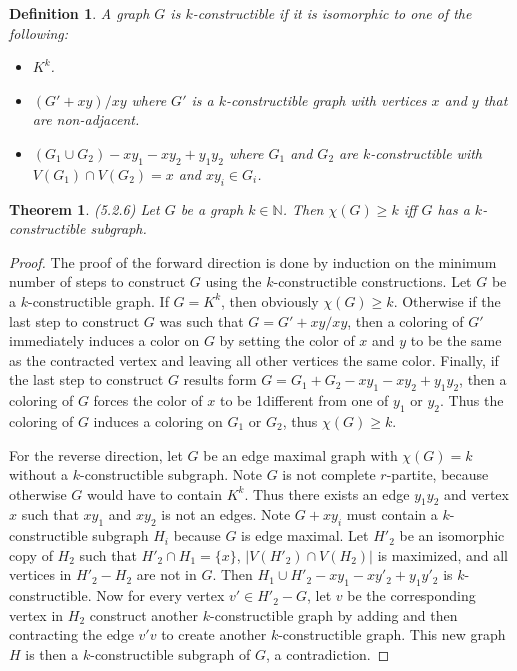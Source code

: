 \documentclass[12pt]{article}
\newtheorem{theorem}{Theorem}
\newtheorem{definition}{Definition}
\begin{document}
\begin{definition} A graph $G$ is $k$-constructible if it is
  isomorphic to one of the following:
  \begin{itemize}
  \item[(i)] $K^k$.
  \item[(ii)] $(G' + xy)/xy$ where $G'$ is a $k$-constructible graph
    with vertices $x$ and $y$ that are non-adjacent.
  \item[(iii)] $(G_1 \cup G_2)-xy_1 - xy_2 + y_1y_2$ where $G_1$ and
    $G_2$ are $k$-constructible with $V(G_1) \cap V(G_2) = x$ and
    $xy_i \in G_i$.
  \end{itemize}
\end{definition}
\begin{theorem} (5.2.6) Let $G$ be a graph $k \in \mathbb{N}$. Then
  $\chi(G) \geq k$ iff $G$ has a $k$-constructible subgraph.
\end{theorem}
\begin{proof} The proof of the forward direction is done by induction
  on the minimum number of steps to construct $G$ using the
  $k$-constructible constructions. Let $G$ be a $k$-constructible
  graph. If $G = K^k$, then obviously $\chi(G) \geq k$. Otherwise if
  the last step to construct $G$ was such that $G = G' + xy /xy$, then
  a coloring of $G'$ immediately induces a color on $G$ by setting the
  color of $x$ and $y$ to be the same as the contracted vertex and
  leaving all other vertices the same color. Finally, if the last step
  to construct $G$ results form $G = G_1 + G_2 -xy_1 - xy_2 + y_1y_2$,
  then a coloring of $G$ forces the color of $x$ to be 1different from
  one of $y_1$ or $y_2$. Thus the coloring of $G$ induces a coloring
  on $G_1$ or $G_2$, thus $\chi(G) \geq k$.

  For the reverse direction, let $G$ be an edge maximal graph with
  $\chi(G) = k$ without a $k$-constructible subgraph. Note $G$ is not
  complete $r$-partite, because otherwise $G$ would have to contain
  $K^k$. Thus there exists an edge $y_1 y_2$ and vertex $x$ such that
  $xy_1$ and $xy_2$ is not an edges. Note $G + x y_i$ must contain a
  $k$-constructible subgraph $H_i$ because $G$ is edge maximal. Let
  $H'_2$ be an isomorphic copy of $H_2$ such that
  $H'_2 \cap H_1 = \{x\}$, $|V(H'_2) \cap V(H_2)|$ is maximized, and
  all vertices in $H'_2 - H_2$ are not in $G$. Then
  $H_1 \cup H'_2 - xy_1 - xy'_2 + y_1y'_2$ is $k$-constructible. Now
  for every vertex $v' \in H'_2 - G$, let $v$ be the corresponding
  vertex in $H_2$ construct another $k$-constructible graph by adding
  and then contracting the edge $v'v$ to create another
  $k$-constructible graph. This new graph $H$ is then a
  $k$-constructible subgraph of $G$, a contradiction.
\end{proof}
\end{document}
